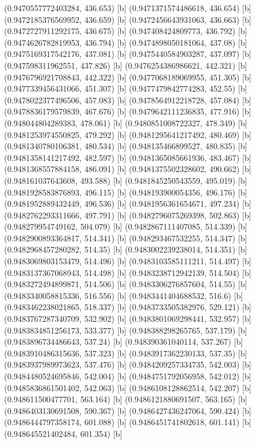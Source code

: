 {{{(0.9470557772403284, 436.653) [b] 
(0.9471371574486618, 436.654) [b] 
(0.9472185376569952, 436.659) [b] 
(0.9472456643931063, 436.663) [b] 
(0.9472727911292175, 436.675) [b] 
(0.947408424809773, 436.792) [b] 
(0.9474626782819953, 436.794) [b] 
(0.9474898050181064, 437.08) [b] 
(0.9475169317542176, 437.081) [b] 
(0.9475440584903287, 437.097) [b] 
(0.947598311962551, 437.826) [b] 
(0.9476254386986621, 442.321) [b] 
(0.9476796921708843, 442.322) [b] 
(0.9477068189069955, 451.305) [b] 
(0.9477339456431066, 451.307) [b] 
(0.9477479842774283, 452.55) [b] 
(0.9478022377496506, 457.083) [b] 
(0.9478564912218728, 457.084) [b] 
(0.9478836179579839, 467.676) [b] 
(0.9479642111236835, 477.916) [b] 
(0.948044804289383, 478.061) [b] 
(0.9480851008722327, 478.349) [b] 
(0.9481253974550825, 479.292) [b] 
(0.9481295641217492, 480.469) [b] 
(0.9481340780106381, 480.534) [b] 
(0.948135466899527, 480.835) [b] 
(0.9481358141217492, 482.597) [b] 
(0.9481365085661936, 483.467) [b] 
(0.9481368557884158, 486.091) [b] 
(0.9481375502328602, 490.662) [b] 
(0.948161037643608, 493.588) [b] 
(0.9481845250543559, 495.019) [b] 
(0.9481928583876893, 496.115) [b] 
(0.948193900054356, 496.176) [b] 
(0.9481952889432449, 496.536) [b] 
(0.9481956361654671, 497.234) [b] 
(0.9482762293311666, 497.791) [b] 
(0.9482796075269398, 502.863) [b] 
(0.948279954749162, 504.079) [b] 
(0.9482867111407085, 514.339) [b] 
(0.9482900893364817, 514.341) [b] 
(0.948293467532255, 514.347) [b] 
(0.9482968457280282, 514.35) [b] 
(0.9483002239238014, 514.351) [b] 
(0.9483069803153479, 514.496) [b] 
(0.9483103585111211, 514.497) [b] 
(0.9483137367068943, 514.498) [b] 
(0.9483238712942139, 514.504) [b] 
(0.9483272494899871, 514.506) [b] 
(0.9483306276857604, 514.55) [b] 
(0.9483340058815336, 516.556) [b] 
(0.9483441404688532, 516.6) [b] 
(0.9483462238021865, 518.337) [b] 
(0.9483733505382976, 529.121) [b] 
(0.9483767287340709, 532.902) [b] 
(0.9483801069298441, 532.957) [b] 
(0.9483834851256173, 533.377) [b] 
(0.948388298265765, 537.179) [b] 
(0.9483896734486643, 537.24) [b] 
(0.948390361040114, 537.267) [b] 
(0.9483910486315636, 537.323) [b] 
(0.9483917362230133, 537.35) [b] 
(0.9483937989973623, 537.476) [b] 
(0.9484209257334735, 542.003) [b] 
(0.9484480524695846, 542.004) [b] 
(0.9484751792056958, 542.012) [b] 
(0.9485836861501402, 542.063) [b] 
(0.9486108128862514, 542.207) [b] 
(0.948611500477701, 563.164) [b] 
(0.9486121880691507, 563.165) [b] 
(0.9486403130691508, 590.367) [b] 
(0.9486427436247064, 590.424) [b] 
(0.9486444797358174, 601.088) [b] 
(0.9486451741802618, 601.141) [b] 
(0.948645521402484, 601.354) [b] 
}}}
